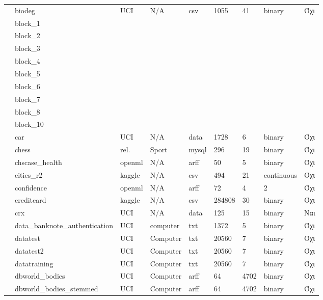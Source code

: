 {\begin{longtable}{|l| l| l | l | l | l |l | l | l | }
 							\rownumber &  biodeg \citep{biodeg} & UCI & N/A& csv &1055 & 41  & binary & Όχι \\
 							\rownumber & block\_1 & & & & & & & \\
 							\rownumber & block\_2 & & & & & & & \\
 							\rownumber & block\_3 & & & & & & & \\
 							\rownumber & block\_4 & & & & & & & \\
 							\rownumber & block\_5 & & & & & & & \\
 							\rownumber & block\_6 & & & & & & & \\
 							\rownumber & block\_7 & & & & & & & \\
 							\rownumber & block\_8 & & & & & & & \\
 							\rownumber & block\_10 & & & & & & & \\
 							\rownumber & car \citep{car} & UCI & N/A & data & 1728 & 6  & binary & Όχι\\
 							\rownumber & chess & rel. & Sport & mysql  & 296 & 19 & binary & Όχι \\
 							\rownumber & chscase\_health \citep{health} & openml & N/A & arff & 50&5 & binary & Όχι \\
 							\rownumber & cities\_r2 \citep{indian} & kaggle & N/A & csv & 494 & 21 & continuous & Όχι \\
 							\rownumber & confidence \citep{confidence}  & openml & N/A & arff & 72 & 4 &2 & Όχι \\
 							\rownumber & creditcard \citep{creditcard} & kaggle & N/A & csv & 284808 & 30 & binary & Όχι \\
 							\rownumber & crx \citep{credit}  & UCI & N/A & data & 125 & 15 & binary & Ναι \\
 							\rownumber & data\_banknote\_authentication\citep{banknote} & UCI & computer  &txt &1372 &5 & binary  & Όχι  \\
 							\rownumber & datatest & UCI & Computer & txt & 20560 & 7 & binary & Όχι \\
 							\rownumber & datatest2 & UCI & Computer & txt & 20560 & 7 & binary & Όχι \\
 							\rownumber & datatraining & UCI & Computer & txt & 20560 & 7 & binary & Όχι \\
 							\rownumber & dbworld\_bodies & UCI & Computer & arff & 64 & 4702 & binary & Όχι \\
 							\rownumber & dbworld\_bodies\_stemmed & UCI & Computer & arff & 64 & 4702 & binary & Όχι \\

\end{longtable}}
